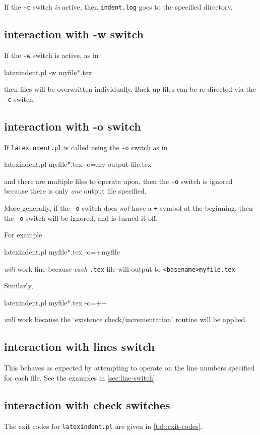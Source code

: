 		If the \texttt{-c} switch \emph{is} active, then \texttt{indent.log} goes to the
		specified directory.

	\subsection{interaction with -w switch}
		If the \texttt{-w} switch is active, as in
		\begin{commandshell}
latexindent.pl -w myfile*.tex
\end{commandshell}
		then files will be overwritten individually. Back-up files can be re-directed via the
		\texttt{-c} switch.

	\subsection{interaction with -o switch}
		If \texttt{latexindent.pl} is called using the \texttt{-o} switch as in
		\begin{commandshell}
latexindent.pl myfile*.tex -o=my-output-file.tex 
        \end{commandshell}
		and there are multiple files to operate upon, then the \texttt{-o} switch is ignored
		because there is only \emph{one} output file specified.

		More generally, if the \texttt{-o} switch does \emph{not} have a \texttt{+} symbol at the
		beginning, then the \texttt{-o} switch will be ignored, and is turned it off.

		For example
		\begin{commandshell}
latexindent.pl myfile*.tex -o=+myfile
\end{commandshell}
		\emph{will} work fine because \emph{each} \texttt{.tex} file will output to
		\texttt{<basename>myfile.tex}

		Similarly,
		\begin{commandshell}
latexindent.pl myfile*.tex -o=++
\end{commandshell}
		\emph{will} work because the `existence check/incrementation' routine will be applied.

	\subsection{interaction with lines switch}
		This behaves as expected by attempting to operate on the line numbers specified for each file. See
		the examples in \cref{sec:line-switch}.

	\subsection{interaction with check switches}
		The exit codes for \texttt{latexindent.pl} are given in \vref{tab:exit-codes}.

